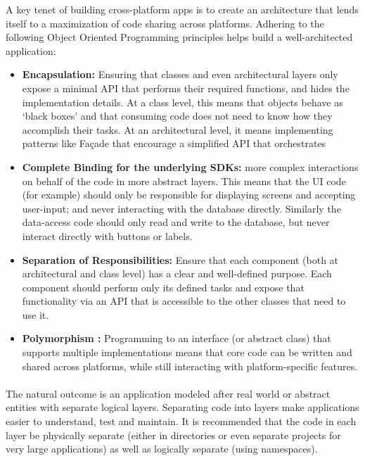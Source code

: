 A key tenet of building cross-platform apps is to create an architecture that lends itself to a maximization of code sharing across platforms. Adhering to the following Object Oriented Programming principles helps build a well-architected application:
 \begin{itemize}
\item \textbf{ Encapsulation:}     Ensuring that classes and even architectural layers only expose a minimal API that performs their required functions, and hides the implementation details. At a class level, this means that objects behave as ‘black boxes’ and that consuming code does not need to know how they accomplish their tasks. At an architectural level, it means implementing patterns like Façade that encourage a simplified API that orchestrates
\item \textbf{ Complete Binding for the underlying SDKs:}   more complex interactions on behalf of the code in more abstract layers. This means that the UI code (for example) should only be responsible for displaying screens and accepting user-input; and never interacting with the database directly. Similarly the data-access code should only read and write to the database, but never interact directly with buttons or labels.
\item \textbf{ Separation of Responsibilities:}     Ensure that each component (both at architectural and class level) has a clear and well-defined purpose. Each component should perform only its defined tasks and expose that functionality via an API that is accessible to the other classes that need to use it.
\item \textbf{ Polymorphism :}   Programming to an interface (or abstract class) that supports multiple implementations means that core code can be written and shared across platforms, while still interacting with platform-specific features.

\end{itemize}

\paragraph{}
The natural outcome is an application modeled after real world or abstract entities with separate logical layers. Separating code into layers make applications easier to understand, test and maintain. It is recommended that the code in each layer be physically separate (either in directories or even separate projects for very large applications) as well as logically separate (using namespaces).

